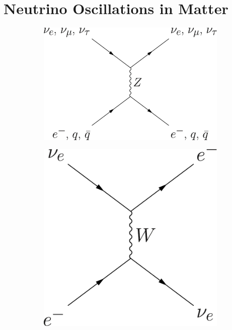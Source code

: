 \clearpage

\section{\label{chap:basics-sec:oscillations-matter}Neutrino Oscillations in Matter}

\begin{figure}[htbp]
\centering
	\begin{subfigure}[t]{0.40\textwidth}
		\centering
		\includegraphics[height=0.2\textheight]{chapters/assets/matter/neutral-current.png}
    \caption{  }
    \label{chap:matter-fig:nc}
	\end{subfigure}%
  \qquad
	\begin{subfigure}[t]{0.40\textwidth}
		\centering
		\includegraphics[height=0.2\textheight]{chapters/assets/matter/charged-current.png}

\end{subfigure}
\end{figure}
